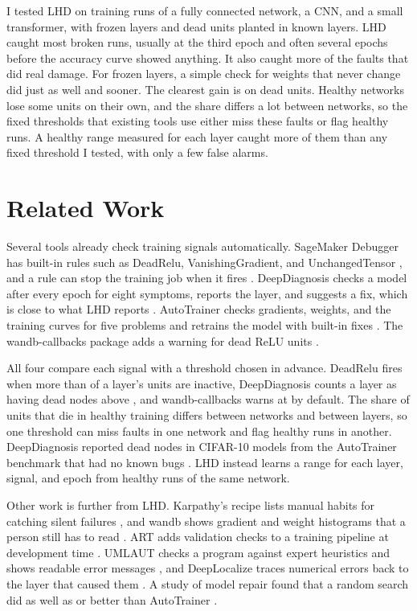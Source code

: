 \documentclass[11pt]{article}
\begin{document}
I tested LHD on \lhdRuns{} training runs of a fully connected network, a CNN, and a small transformer, with frozen layers and dead units planted in known layers. LHD caught most broken runs, usually at the third epoch and often several epochs before the accuracy curve showed anything. It also caught more of the faults that did real damage. For frozen layers, a simple check for weights that never change did just as well and sooner. The clearest gain is on dead units. Healthy networks lose some units on their own, and the share differs a lot between networks, so the fixed thresholds that existing tools use either miss these faults or flag healthy runs. A healthy range measured for each layer caught more of them than any fixed threshold I tested, with only a few false alarms.

\section{Related Work}
\label{sec:related}

Several tools already check training signals automatically. SageMaker Debugger has built-in rules such as DeadRelu, VanishingGradient, and UnchangedTensor \citep{aws_rules}, and a rule can stop the training job when it fires \citep{aws_actions}. DeepDiagnosis checks a model after every epoch for eight symptoms, reports the layer, and suggests a fix, which is close to what LHD reports \citep{wardat2022}. AutoTrainer checks gradients, weights, and the training curves for five problems and retrains the model with built-in fixes \citep{zhang2021}. The wandb-callbacks package adds a warning for dead ReLU units \citep{groeger_wandbcallbacks}.

All four compare each signal with a threshold chosen in advance. DeadRelu fires when more than \lhdSageThreshold{} of a layer's units are inactive, DeepDiagnosis counts a layer as having dead nodes above \lhdDeepThreshold{}, and wandb-callbacks warns at \lhdWandbThreshold{} by default. The share of units that die in healthy training differs between networks and between layers, so one threshold can miss faults in one network and flag healthy runs in another. DeepDiagnosis reported dead nodes in \lhdLitDeadNodes{} CIFAR-10 models from the AutoTrainer benchmark that had no known bugs \citep{wardat2022}. LHD instead learns a range for each layer, signal, and epoch from healthy runs of the same network.

Other work is further from LHD. Karpathy's recipe lists manual habits for catching silent failures \citep{karpathy2019}, and wandb shows gradient and weight histograms that a person still has to read \citep{biewald2020}. ART adds validation checks to a training pipeline at development time \citep{chwilczynski2024}. UMLAUT checks a program against expert heuristics and shows readable error messages \citep{schoop2021}, and DeepLocalize traces numerical errors back to the layer that caused them \citep{wardat2021}. A study of model repair found that a random search did as well as or better than AutoTrainer \citep{kim2023}.
\end{document}
